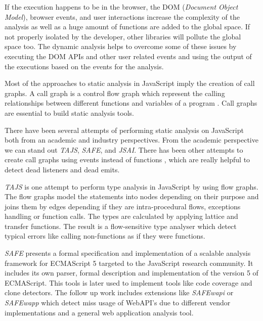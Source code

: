 \documentclass{uvamscse}
\begin{document}
If the execution happens to be in the browser, the DOM (\textit{Document Object Model}), browser events, and user interactions increase the complexity of the analysis as well as a huge amount of functions are added to the global space. If not properly isolated by the developer, other libraries will pollute the global space too. The dynamic analysis helps to overcome some of these issues by executing the DOM APIs and other user related events and using the output of the executions based on the events for the analysis.

Most of the approaches to static analysis in JavaScript imply the creation of call graphs. A call graph is a control flow graph which represent the calling relationships between different functions and variables of a program \cite{FeldthausAsger2013Ecoa}. Call graphs are essential to build static analysis tools.

There have been several attempts of performing static analysis on JavaScript both from an academic and industry perspectives. From the academic perspective we can stand out \textit{TAJS}, \textit{SAFE}, and \textit{JSAI}. There has been other attempts to create call graphs using events instead of functions \cite{MadsenMagnus2015Saoe}, which are really helpful to detect dead listeners and dead emits.

\textit{TAJS} \cite{tajs2009} is one attempt to perform type analysis in JavaScript by using flow graphs. The flow graphs model the statements into nodes depending on their purpose and joins them by edges depending if they are intra-procedural flows, exceptions handling or function calls. The types are calculated by applying lattice and transfer functions. The result is a flow-sensitive type analyser which detect typical errors like calling non-functions as if they were functions.

\textit{SAFE} \cite{lee2012safe} presents a formal specification and implementation of a scalable analysis framework for ECMAScript 5 targeted to the JavaScript research community. It includes its own parser, formal description and implementation of the version 5 of ECMAScript. This tools is later used to implement tools like code coverage and clone detectors. The follow up work includes extensions like \textit{SAFEwapi} \cite{safewapi} or \textit{SAFEwapp} \cite{safewebapp} which detect miss usage of WebAPI's due to different vendor implementations and a general web application analysis tool.
\end{document}

